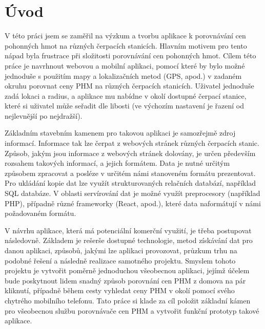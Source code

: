 \chapter{Úvod}
\label{sec:Introduction}
V této práci jsem se zaměřil na výzkum a tvorbu aplikace k porovnávání cen pohonných hmot na různých čerpacích stanicích. Hlavním motivem pro tento nápad byla frustrace při složitosti porovnávání cen pohonných hmot. Cílem této práce je navrhnout webovou a mobilní aplikaci, pomocí které by bylo možné jednoduše s použitím mapy a lokalizačních metod (GPS, apod.) v zadaném okruhu porovnat ceny PHM na různých čerpacích stanicích. Uživatel jednoduše zadá lokaci a radius, a aplikace mu nabídne v okolí dostupné čerpací stanice, které si uživatel může seřadit dle libosti (ve výchozím nastavení je řazení od nejlevnější po nejdražší).

Základním stavebním kamenem pro takovou aplikaci je samozřejmě zdroj informací. Informace tak lze čerpat z webových stránek různých čerpacích stanic. Způsob, jakým jsou informace z webových stránek dolovány, je určen především rozsahem takových informací, a jejich formátem. Data je nutné určitým způsobem zpracovat a posléze v určitém námi stanoveném formátu prezentovat. Pro ukládání kopie dat lze využít strukturovaných relačních databází, například SQL databáze. V oblasti servírování dat je možné využít preprocesory (například PHP), případně různé frameworky (React, apod.), které data naformátují v námi požadovaném formátu.

V návrhu aplikace, která má potenciální komerční využití, je třeba postupovat následovně. Základem je rešerše dostupné technologie, metod získávání dat pro danou aplikaci, způsobů, jakými lze aplikaci provozovat, průzkum trhu na podobné řešení a následně realizace samotného projektu. Smyslem tohoto projektu je vytvořit poměrně jednoduchou všeobecnou aplikaci, jejímž účelem bude poskytnout lidem snadný způsob porovnání cen PHM z domova na pár kliknutí, případně během cesty vyhledat ceny PHM v okolí pomocí svého chytrého mobilního telefonu. Tato práce si klade za cíl položit základní kámen pro všeobecnou službu porovnávače cen PHM a vytvořit funkční prototyp takové aplikace.
\endinput
